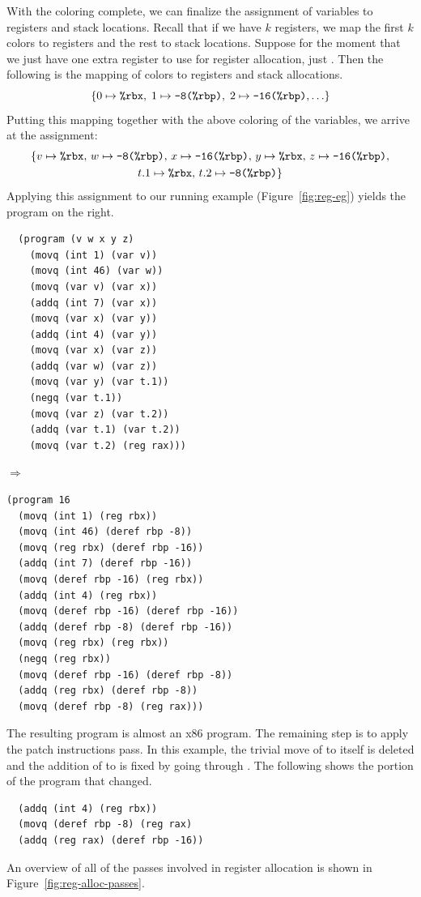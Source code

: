 \documentclass[11pt]{book}
\begin{document}
With the coloring complete, we can finalize the assignment of
variables to registers and stack locations. Recall that if we have $k$
registers, we map the first $k$ colors to registers and the rest to
stack locations.  Suppose for the moment that we just have one extra
register to use for register allocation, just . Then the
following is the mapping of colors to registers and stack allocations.
\[
  \{ 0 \mapsto \texttt{\%rbx}, \; 1 \mapsto \texttt{-8(\%rbp)}, \; 2 \mapsto \texttt{-16(\%rbp)}, \ldots \}
\]
Putting this mapping together with the above coloring of the variables, we
arrive at the assignment:
\begin{gather*}
  \{ v \mapsto \texttt{\%rbx}, \,
  w \mapsto \texttt{-8(\%rbp)},  \,
  x \mapsto \texttt{-16(\%rbp)}, \,
  y \mapsto \texttt{\%rbx},  \,
  z\mapsto \texttt{-16(\%rbp)}, \\
  t.1\mapsto \texttt{\%rbx} ,\,
  t.2\mapsto \texttt{-8(\%rbp)} \}
\end{gather*}
Applying this assignment to our running example
(Figure~\ref{fig:reg-eg}) yields the program on the right.\\
\begin{minipage}{0.4\textwidth}
\begin{lstlisting}
  (program (v w x y z)
    (movq (int 1) (var v))
    (movq (int 46) (var w))
    (movq (var v) (var x))
    (addq (int 7) (var x))
    (movq (var x) (var y))
    (addq (int 4) (var y))
    (movq (var x) (var z))
    (addq (var w) (var z))
    (movq (var y) (var t.1))
    (negq (var t.1))
    (movq (var z) (var t.2))
    (addq (var t.1) (var t.2))
    (movq (var t.2) (reg rax)))
\end{lstlisting}
\end{minipage}
$\Rightarrow$
\begin{minipage}{0.45\textwidth}
\begin{lstlisting}
(program 16
  (movq (int 1) (reg rbx))
  (movq (int 46) (deref rbp -8))
  (movq (reg rbx) (deref rbp -16))
  (addq (int 7) (deref rbp -16))
  (movq (deref rbp -16) (reg rbx))
  (addq (int 4) (reg rbx))
  (movq (deref rbp -16) (deref rbp -16))
  (addq (deref rbp -8) (deref rbp -16))
  (movq (reg rbx) (reg rbx))
  (negq (reg rbx))
  (movq (deref rbp -16) (deref rbp -8))
  (addq (reg rbx) (deref rbp -8))
  (movq (deref rbp -8) (reg rax)))
\end{lstlisting}
\end{minipage}

The resulting program is almost an x86 program. The remaining step
is to apply the patch instructions pass. In this example, the trivial
move of  to itself is deleted and the addition of
 to  is fixed by going through
. The following shows the portion of the program that
changed.
\begin{lstlisting}
  (addq (int 4) (reg rbx))
  (movq (deref rbp -8) (reg rax)
  (addq (reg rax) (deref rbp -16))
\end{lstlisting}
An overview of all of the passes involved in register allocation is
shown in Figure~\ref{fig:reg-alloc-passes}.
\end{document}

